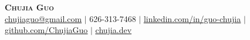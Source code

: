 \documentclass[letterpaper,10pt]{article}
\begin{document}
\begin{center}
	\textbf{\Huge \scshape Chujia Guo} \\ \vspace{1pt}
	\href{mailto:chujiaguo@gmail.com}{\underline{chujiaguo@gmail.com}}  $|$ \small 626-313-7468 $|$ 
	\href{https://linkedin.com/in/guo-chujia}{\underline{linkedin.com/in/guo-chujia}}  $|$
	\href{https://github.com/ChujiaGuo}{\underline{github.com/ChujiaGuo}} $|$
    \href{https://chujia.dev}{\underline{chujia.dev}}
\end{center}
\end{document}
